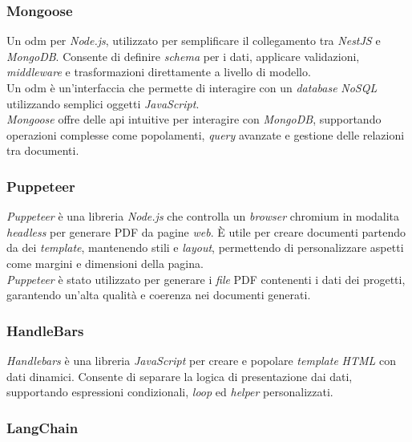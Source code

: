\subsubsection{Mongoose}

Un \gls{odm} per \textit{Node.js}, utilizzato per semplificare il collegamento tra \textit{NestJS} e \textit{MongoDB}. Consente di definire \textit{schema} per i dati, applicare validazioni, \textit{middleware} e trasformazioni direttamente a livello di modello. \\
Un \gls{odm} è un'interfaccia che permette di interagire con un \textit{database} \textit{NoSQL} utilizzando semplici oggetti \textit{JavaScript}.\\
\textit{Mongoose} offre delle \gls{api} intuitive per interagire con \textit{MongoDB}, supportando operazioni complesse come popolamenti, \textit{query} avanzate e gestione delle relazioni tra documenti. 

\subsubsection{Puppeteer}

\textit{Puppeteer} è una libreria \textit{Node.js} che controlla un \textit{browser} \gls{chromium} in modalita \textit{headless} per generare PDF da pagine \textit{web}.
È utile per creare documenti partendo da dei \textit{template}, mantenendo stili e \textit{layout}, permettendo di personalizzare aspetti come margini e dimensioni della pagina.\\
\textit{Puppeteer} è stato utilizzato per generare i \textit{file} PDF contenenti i dati dei progetti, garantendo un'alta qualità e coerenza nei documenti generati.

\subsubsection{HandleBars}

\textit{Handlebars} è una libreria \textit{JavaScript} per creare e popolare \textit{template} \textit{HTML} con dati dinamici. 
Consente di separare la logica di presentazione dai dati, supportando espressioni condizionali, \textit{loop} ed \textit{helper} personalizzati.


\subsubsection{LangChain}

